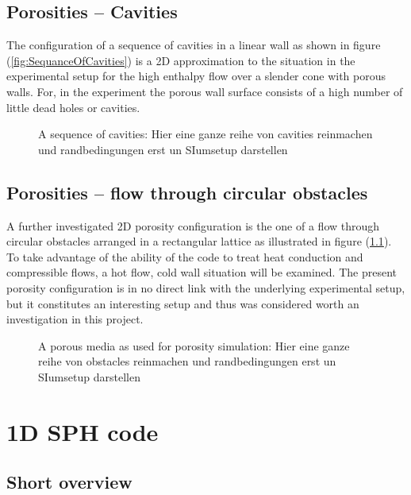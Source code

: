 \documentclass{report}
\begin{document}
\subsection{Porosities -- Cavities}
\label{sec:Porosities_Cavity}
The configuration of a sequence of cavities in a linear wall as shown in figure (\ref{fig:SequanceOfCavities}) is a 2D approximation to the situation in the experimental setup for the high enthalpy flow over a slender cone with porous walls. For, in the experiment the porous wall surface consists of a high number of little dead holes or cavities.

\begin{figure}[!htbp]
  \centering
  \caption{A sequence of cavities: Hier eine ganze reihe von cavities reinmachen und randbedingungen erst un SIumsetup darstellen }
  \label{fig:PorositiesSequenceOfCavities}
\end{figure}


\subsection{Porosities -- flow through circular obstacles}
\label{sec:PorositiesCircularObstacles}
A further investigated 2D porosity configuration is the one of a flow through circular obstacles arranged in a rectangular lattice as illustrated in figure (\ref{}). To take advantage of the ability of the code to treat heat conduction and compressible flows, a hot flow, cold wall situation will be examined. The present porosity configuration is in no direct link with the underlying experimental setup, but it constitutes an interesting setup and thus was considered worth an investigation in this project. 

\begin{figure}[!htbp]
  \centering
  \caption{A porous media as used for porosity simulation: Hier eine ganze reihe von obstacles reinmachen und randbedingungen erst un SIumsetup darstellen }
  \label{fig:PorositiesCircularObstacles}
\end{figure}


\section{1D SPH code}
\label{sec:1DSPHcode}

\subsection{Short overview}
\end{document}
